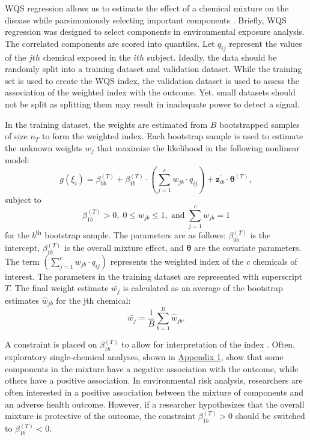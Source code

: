 WQS regression allows us to estimate the effect of a chemical mixture on
the disease while parsimoniously selecting important components
\citep{carricoCharacterizationWeightedQuantile2014, czarnotaAssessmentWeightedQuantile2015, genningsCohortStudyEvaluation2013, hargartenAccountingUncertaintyDue2020}.
Briefly, WQS regression was designed to select components in
environmental exposure analysis. The correlated components are scored
into quantiles. Let \(q_{ij}\) represent the values of the \(jth\)
chemical exposed in the \(ith\) subject. Ideally, the data should be
randomly split into a training dataset and validation dataset. While the
training set is used to create the WQS index, the validation dataset is
used to assess the association of the weighted index with the outcome.
Yet, small datasets should not be split as splitting them may result in
inadequate power to detect a signal.

In the training dataset, the weights are estimated from \(B\)
bootstrapped samples of size \(n_T\) to form the weighted index. Each
bootstrap sample is used to estimate the unknown weights \(w_j\) that
maximize the likelihood in the following nonlinear model:
\[g( \xi_{i} ) = \beta_{0b}^{(T)} + \beta_{1b}^{(T)} \cdot \left( \sum_{j=1}^c w_{jb}\cdot q_{ij} \right) + \boldsymbol{z}_{ib}^{\prime} \cdot \boldsymbol{\theta}^{(T)}, \]
subject to
\[\beta_{1b}^{(T)} >0, \; 0 \le w_{jb} \le 1, \; \text{and} \; \sum_{j=1}^c w_{jb} = 1 \]
for the \(b^{\text{th}}\) bootstrap sample. The parameters are as
follows: \(\beta_{0b}^{(T)}\) is the intercept, \(\beta_{1b}^{(T)}\) is
the overall mixture effect, and \(\boldsymbol{\theta}\) are the
covariate parameters. The term
\(\left( \sum_{j=1}^c w_{jb}\cdot q_{ij} \right)\) represents the
weighted index of the \(c\) chemicals of interest. The parameters in the
training dataset are represented with superscript \(T\). The final
weight estimate \(\bar{w_j}\) is calculated as an average of the
bootstrap estimates \(\hat{w}_{jb}\) for the jth chemical:
\[\bar{w_j} = \frac{1}{B} \sum_{b=1}^B \hat{w}_{jb}.\]

A constraint is placed on \(\beta_{1b}^{(T)}\) to allow for
interpretation of the index
\citep{carricoCharacterizationWeightedQuantile2014}. Often, exploratory
single-chemical analyses, shown in
\protect\hyperlink{Appendix-1}{Appendix 1}, show that some components in
the mixture have a negative association with the outcome, while others
have a positive association. In environmental risk analysis, researchers
are often interested in a positive association between the mixture of
components and an adverse health outcome. However, if a researcher
hypothesizes that the overall mixture is protective of the outcome, the
constraint \(\beta_{1b}^{(T)} > 0\) should be switched to
\(\beta_{1b}^{(T)} < 0\).

